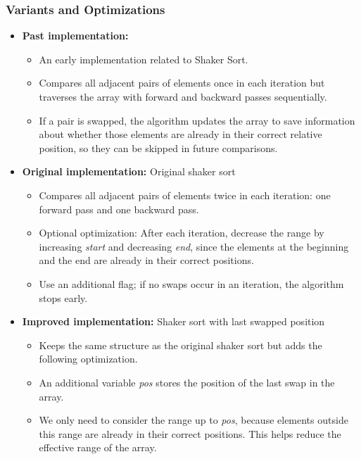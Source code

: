     \subsubsection{Variants and Optimizations}
        \begin{itemize}
            \item \textbf{Past implementation:\cite{iverson1962apl}}
                \begin{itemize}
                    \item An early implementation related to Shaker Sort.
                    \item Compares all adjacent pairs of elements once in each iteration but traverses the array with forward and backward passes sequentially.
                    \item If a pair is swapped, the algorithm updates the array to save information about whether those elements are already in their correct relative position, so they can be skipped in future comparisons.
                \end{itemize}

            \item \textbf{Original implementation: } Original shaker sort
            \begin{itemize}
                \item Compares all adjacent pairs of elements twice in each iteration: one forward pass and one backward pass.
                \item Optional optimization: After each iteration, decrease the range by increasing \textit{start} and decreasing \textit{end}, since the elements at the beginning and the end are already in their correct positions.
                \item Use an additional flag; if no swaps occur in an iteration, the algorithm stops early.
            \end{itemize}

            \item \textbf{Improved implementation:\cite[Slide~31]{thao_sorting_slides}} Shaker sort with last swapped position
            \begin{itemize}
                \item Keeps the same structure as the original shaker sort but adds the following optimization.
                \item An additional variable \textit{pos} stores the position of the last swap in the array.
                \item We only need to consider the range up to \textit{pos}, because elements outside this range are already in their correct positions. This helps reduce the effective range of the array.
            \end{itemize}
        \end{itemize}